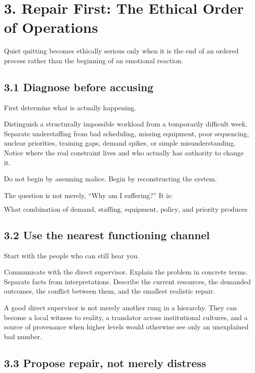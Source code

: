 \documentclass[11pt,oneside]{article}
\begin{document}
\section{3. Repair First: The Ethical Order of Operations}\label{repair-first-the-ethical-order-of-operations}

Quiet quitting becomes ethically serious only when it is the end of an ordered process rather than the beginning of an emotional reaction.

\subsection{3.1 Diagnose before accusing}\label{diagnose-before-accusing}

First determine what is actually happening.

Distinguish a structurally impossible workload from a temporarily difficult week. Separate understaffing from bad scheduling, missing equipment, poor sequencing, unclear priorities, training gaps, demand spikes, or simple misunderstanding. Notice where the real constraint lives and who actually has authority to change it.

Do not begin by assuming malice. Begin by reconstructing the system.

The question is not merely, ``Why am I suffering?'' It is:

\[
\text{What combination of demand, staffing, equipment, policy, and priority produces this outcome?}
\]

\subsection{3.2 Use the nearest functioning channel}\label{use-the-nearest-functioning-channel}

Start with the people who can still hear you.

Communicate with the direct supervisor. Explain the problem in concrete terms. Separate facts from interpretations. Describe the current resources, the demanded outcomes, the conflict between them, and the smallest realistic repair.

A good direct supervisor is not merely another rung in a hierarchy. They can become a local witness to reality, a translator across institutional cultures, and a source of provenance when higher levels would otherwise see only an unexplained bad number.

\subsection{3.3 Propose repair, not merely distress}\label{propose-repair-not-merely-distress}
\end{document}
